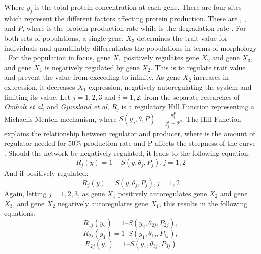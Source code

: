 Where $y_j$ is the total protein concentration at each gene. There are four sites which represent the different factors affecting protein production. These are \textit{\textalpha}, \textit{\textgamma}, \textit{\texttheta} and $P$, where \textit{\textalpha} is the protein production rate while \textit{\textgamma} is the degradation rate \cite{omholt2000gene}. For both sets of populations, a single gene, $X_3$ determines the trait value for individuals and quantifiably differentiates the populations in terms of morphology \cite{orr2001genetics}. For the population in focus, gene $X_1$ positively regulates gene $X_2$ and gene $X_3$, and gene $X_1$ is negatively regulated by gene $X_2$.
This is to regulate trait value and prevent the value from exceeding to infinity. As gene $X_2$ increases in expression, it decreases $X_1$ expression, negatively autoregulating the system and limiting its value. Let $j = {1,2,3}$ and $i = {1,2}$, from the separate researches of \textit{Omholt et al}, and \textit{Gjuvsland et al}, $R_{j}$ is a regulatory Hill Function representing a Michaelis-Menten mechanism, where $S(y_j,\theta,P) = \frac{y_j^P}{y_j^P+\theta^P}$. The Hill Function explains the relationship between regulator and producer, where \texttheta is the amount of regulator needed for 50\% production rate and P affects the steepness of the curve \cite{gjuvsland2007statistical,omholt2000gene}. Should the network be negatively regulated, it leads to the following equation:
\begin{equation*}
    R_{j}(y) = 1 - S(y, \theta_j , P_j), j = {1, 2} \label{eq:Negative autoregulation function} \tag{2}
\end{equation*}
And if positively regulated:
\begin{equation*}
	R_{j}(y) = S(y, \theta_j, P_j), j = {1, 2} \label{eq:Positive autoregulation function} \tag{3}
\end{equation*}
Again, letting $j = {1,2,3}$, as gene $X_1$ positively autoregulates gene $X_2$ and gene $X_3$, and gene $X_2$ negatively autoregulates gene $X_1$, this results in the following equations:
\begin{equation*}
    R_{1j}(y_2) = 1 – S(y_2, \theta_{2j}, P_{2j}) \label{eq:X1 negative autoregulation function} \tag{4.1},
\end{equation*}
\begin{equation*}
    R_{2j}(y_1) = 1 – S(y_1, \theta_{1j}, P_{1j}) \label{eq:X2 positive autoregulation function} \tag{4.2},
\end{equation*}
\begin{equation*}
    R_{2j}(y_1) = 1 – S(y_1, \theta_{3j}, P_{3j}) \label{eq:X3 positive autoregulation function} \tag{4.3}
\end{equation*}
